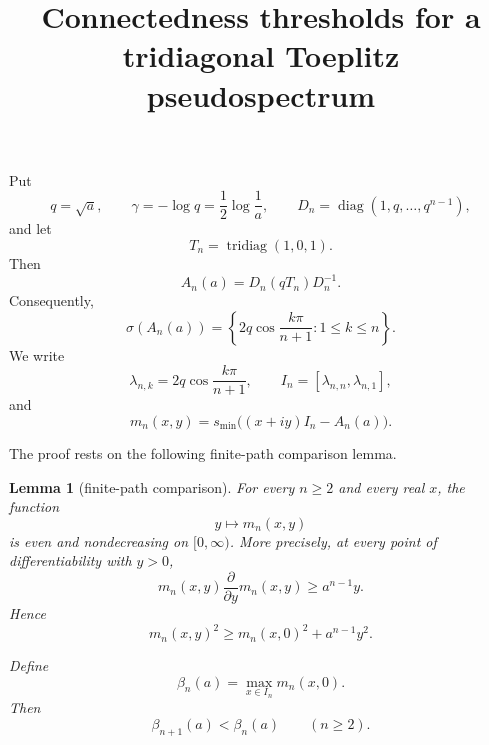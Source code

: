 \documentclass[11pt]{article}
\title{Connectedness thresholds for a tridiagonal Toeplitz pseudospectrum}
\author{}
\date{}
\newtheorem{lemma}[theorem]{Lemma}
\begin{document}
\maketitle

Put
\[
q=\sqrt a,\qquad
\gamma=-\log q=\frac12\log\frac1a,
\qquad
D_n=\operatorname{diag}(1,q,\ldots,q^{n-1}),
\]
and let
\[
T_n=\operatorname{tridiag}(1,0,1).
\]
Then
\[
A_n(a)=D_n(qT_n)D_n^{-1}.
\]
Consequently,
\[
\sigma(A_n(a))
=
\left\{
2q\cos\frac{k\pi}{n+1}:1\leq k\leq n
\right\}.
\]
We write
\[
\lambda_{n,k}=2q\cos\frac{k\pi}{n+1},
\qquad
I_n=[\lambda_{n,n},\lambda_{n,1}],
\]
and
\[
m_n(x,y)=s_{\min}\bigl((x+iy)I_n-A_n(a)\bigr).
\]

The proof rests on the following finite-path comparison lemma.

\begin{lemma}[finite-path comparison]\label{lem:path}
For every \(n\geq2\) and every real \(x\), the function
\[
y\longmapsto m_n(x,y)
\]
is even and nondecreasing on \([0,\infty)\). More precisely, at every point of differentiability with \(y>0\),
\[
m_n(x,y)\frac{\partial}{\partial y}m_n(x,y)
\geq a^{n-1}y.
\]
Hence
\[
m_n(x,y)^2
\geq
m_n(x,0)^2+a^{n-1}y^2.
\tag{1}\label{eq:vertical}
\]

Define
\[
\beta_n(a)=\max_{x\in I_n}m_n(x,0).
\]
Then
\[
\beta_{n+1}(a)<\beta_n(a)
\qquad(n\geq2).
\tag{2}\label{eq:strict-beta}
\]
\end{lemma}
\end{document}
